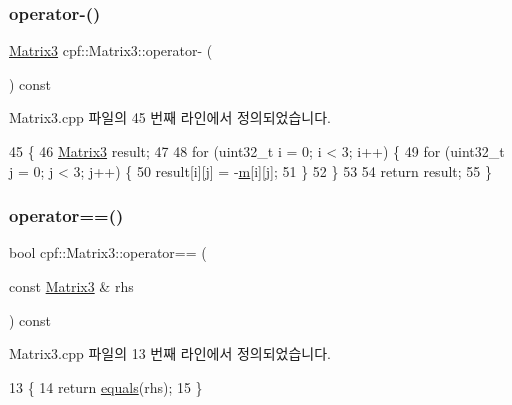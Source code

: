 \subsubsection{\texorpdfstring{operator-\/()}{operator-()}\hspace{0.1cm}{\footnotesize\ttfamily [2/2]}}
{\footnotesize\ttfamily \hyperlink{classcpf_1_1_matrix3}{Matrix3} cpf\+::\+Matrix3\+::operator-\/ (\begin{DoxyParamCaption}{ }\end{DoxyParamCaption}) const}



Matrix3.\+cpp 파일의 45 번째 라인에서 정의되었습니다.


\begin{DoxyCode}
45                                       \{
46         \hyperlink{classcpf_1_1_matrix3_a449a9e860e87c053355379869430cbb7}{Matrix3} result;
47 
48         \textcolor{keywordflow}{for} (uint32\_t i = 0; i < 3; i++) \{
49             \textcolor{keywordflow}{for} (uint32\_t j = 0; j < 3; j++) \{
50                 result[i][j] = -\hyperlink{classcpf_1_1_matrix3_a544955e219e5edd0c933f5e83dde9fac}{m}[i][j];
51             \}
52         \}
53 
54         \textcolor{keywordflow}{return} result;
55     \}
\end{DoxyCode}
\mbox{\label{classcpf_1_1_matrix3_a9269345dbe1cc4b6846295b19e3ca502}} 
\subsubsection{\texorpdfstring{operator==()}{operator==()}}
{\footnotesize\ttfamily bool cpf\+::\+Matrix3\+::operator== (\begin{DoxyParamCaption}\item[{const \hyperlink{classcpf_1_1_matrix3}{Matrix3} \&}]{rhs }\end{DoxyParamCaption}) const}



Matrix3.\+cpp 파일의 13 번째 라인에서 정의되었습니다.


\begin{DoxyCode}
13                                                      \{
14         \textcolor{keywordflow}{return} \hyperlink{classcpf_1_1_matrix3_a6a2b12e2cba8a6f03c686a363e55934d}{equals}(rhs);
15     \}
\end{DoxyCode}
\mbox{\label{classcpf_1_1_matrix3_a75a890aec8069c98a80769da97b5a889}} 
